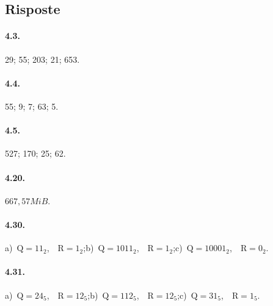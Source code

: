 \subsection{Risposte}

\paragraph{4.3.} 29; 55; 203; 21; 653.

\paragraph{4.4.} 55; 9; 7; 63; 5.

\paragraph{4.5.} 527; 170; 25; 62.

\paragraph{4.20.} $667,57\unit{MiB}$.

\paragraph{4.30.}
a)~$\text{Q}=11_2$,~~$\text{R}=1_2$;\quad b)~$\text{Q}=1011_2$,~~$\text{R}=1_2$;\quad c)~$\text{Q}=10001_2$,~~$\text{R}=0_2$.

\paragraph{4.31.}
a)~$\text{Q}=24_5$,~~$\text{R}=12_5$;\quad b)~$\text{Q}=112_5$,~~$\text{R}=12_5$;\quad c)~$\text{Q}=31_5$,~~$\text{R}=1_5$.
